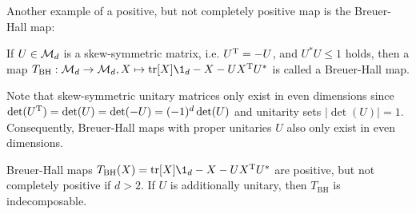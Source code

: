Another example of a positive, but not completely positive map is the Breuer-Hall map:
\begin{definition}If $U \in \mathcal M_d$ is a skew-symmetric matrix, i.e. $U^\text T = -U$, and $U^*U\leq 1$ holds, then a map $T_\text{BH}:\m M_d \rightarrow \m M_d, X \mapsto \tr[X]\1_d - X - UX^\text TU^*$ is called a Breuer-Hall map.
{}
\end{definition}\noindent
Note that skew-symmetric unitary matrices only exist in even dimensions since $\det(U^\text T)=\det(U)=\det(-U)=(-1)^d\det(U)$ and unitarity sets $\vert \det(U)\vert = 1$. Consequently, Breuer-Hall maps with proper unitaries $U$ also only exist in even dimensions.
\begin{prop}\label{prop:breuer}
    Breuer-Hall maps $T_\text{BH}(X) = \tr[X]\1_d - X - UX^\text TU^*$ are positive, but not completely positive if $d>2$. If $U$ is additionally unitary, then $T_\text{BH}$ is indecomposable.
\end{prop}
